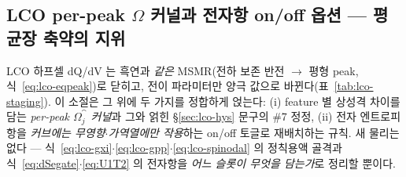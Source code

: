 \subsection{LCO per-peak $\Omega$ 커널과 전자항 on/off 옵션 --- 평균장 축약의 지위}\label{ssec:lco-omega}
LCO 하프셀 dQ/dV 는 흑연과 \emph{같은} MSMR(전하 보존 반전 $\to$ 평형 peak, 식~\eqref{eq:lco-eqpeak})로 닫히고,
전이 파라미터만 양극 값으로 바뀐다(표~\ref{tab:lco-staging}). 이 소절은 그 위에 두 가지를 정합하게 얹는다:
(i) feature 별 상성격 차이를 담는 \emph{per-peak $\Omega_j^\cat$ 커널}과 그와 얽힌 \S\ref{sec:lco-hys} 문구의
\#7 정정, (ii) 전자 엔트로피 항을 \emph{커브에는 무영향$\cdot$가역열에만 작용}하는 on/off 토글로 재배치하는 규칙.
새 물리는 없다 --- 식~\eqref{eq:lco-gxi}$\cdot$\eqref{eq:lco-gpp}$\cdot$\eqref{eq:lco-spinodal} 의 정칙용액 골격과
식~\eqref{eq:dSegate}$\cdot$\eqref{eq:U1T2} 의 전자항을 \emph{어느 슬롯이 무엇을 담는가}로 정리할 뿐이다.

